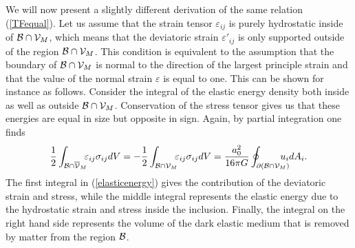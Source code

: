 \documentclass[a4paper,12pt]{article}
\begin{document}
We will now present a slightly different derivation of the same relation (\ref{TFequal}). Let us assume that the strain tensor $\varepsilon_{ij}$ is purely hydrostatic inside of ${\cal B}\cap {\cal V}_M$, which means that the deviatoric strain $\varepsilon'_{ij}$ is only supported outside of the region ${\cal B}\cap {\cal V}_M$. This condition is equivalent to the assumption that the
boundary of ${\cal B}\cap {\cal V}_M$ is normal to the direction of the largest principle strain
and that the value of the normal strain $\varepsilon$ is equal to one.   This can be shown for instance as follows.  Consider the integral of the elastic energy density both inside as well as outside   ${\cal B}\cap {\cal V}_M$. Conservation of the stress tensor gives us that these energies are equal in size but opposite in sign. Again, by partial integration one finds
\begin{equation}
\label{elasticenergy}
{1\over 2}\int_{{\cal B}\cap \overline{{\cal V}}_M}  \!\!\!\varepsilon_{ij}\sigma_{ij} dV	= - {1\over 2}\int_{{\cal B}\cap {\cal V}_M} \!\!\!\varepsilon_{ij}\sigma_{ij} dV ={a_0^2\over 16\pi G}  \oint_{\partial({\cal B}\cap {\cal V}_M) }\!\!\!\! \!\!\! u_i dA_i	 . %
\end{equation}
The first  integral in (\ref{elasticenergy}) gives the contribution of the deviatoric strain and stress, while the middle integral represents the elastic energy due to the hydrostatic strain and stress inside the inclusion. 
 Finally, the integral on the right hand side represents the volume of the dark elastic medium that is removed by matter from the region $\cal B$. 
\end{document}
